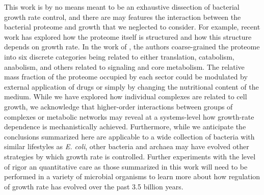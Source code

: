 This work is by no means meant to be an exhaustive dissection of bacterial
growth rate control, and there are may features the interaction between the
bacterial proteome and growth that we neglected to consider. For example, recent
work \citep{hui2015, schmidt2016} has explored how the proteome itself is
structured and how this structure depends on growth rate. In the work of
\cite{hui2015}, the authors coarse-grained the proteome into six discrete
categories being related to either translation, catabolism, anabolism, and
others related to signaling and core metabolism. The relative mass fraction of
the proteome occupied by each sector could be modulated by external application
of drugs or simply by changing the nutritional content of the medium. While we
have explored how individual complexes are related to cell growth, we
acknowledge that higher-order interactions between groups of complexes or
metabolic networks may reveal at a systems-level how growth-rate dependence
is mechanistically achieved. Furthermore, while we anticipate the conclusions
summarized here are applicable to a wide collection of bacteria with similar
lifestyles as \textit{E. coli}, other bacteria and archaea may have evolved
other strategies by which growth rate is controlled. Further experiments with
the level of rigor an quantitative care as those summarized in this work will
need to be performed in a variety of microbial organisms to learn more about how
regulation of growth rate has evolved over the past 3.5 billion years.

%
%
%
%
%
%


